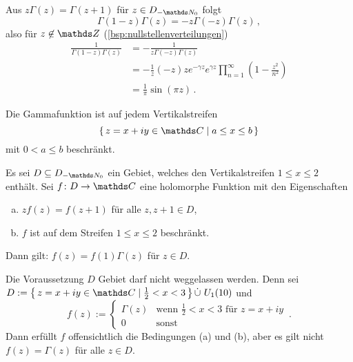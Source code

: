 \begin{bewe-list}
\item Aus $z\Gamma(z) = \Gamma(z+1)$ für $z\in D_{-\NN_0}$ folgt
\[
	\Gamma(1-z)\Gamma(z)
	= -z \Gamma(-z)\Gamma(z)
	\,,
\]
also für $z\not\in \ZZ$ (\autoref{bsp:nullstellenverteilungen})
\begin{align*}
	\frac{1}{\Gamma(1-z)\Gamma(z)}
	&= -\frac{1}{z\Gamma(-z)\Gamma(z)} \\
	&= -\frac{1}{z}(-z)ze^{-\gamma z}e^{\gamma z}\prod_{n=1}^\infty \left(1-\frac{z^2}{n^2}\right) \\
	&= \frac{1}{\pi} \sin(\pi z)
	\,.
\end{align*}
\end{bewe-list}

\begin{satz-list}\label{satz:wielandt}
\item Die Gammafunktion ist auf jedem Vertikalstreifen
\[
	\Set{z=x+iy \in\CC \mid a \leq x \leq b}
\]
mit $0 < a \leq b$ beschränkt.

\item Es sei $D\subseteq D_{-\NN_0}$ ein Gebiet, welches den Vertikalstreifen $1 \leq x \leq 2$ enthält.
Sei $f\colon D\ra \CC$ eine holomorphe Funktion mit den Eigenschaften
\begin{enumerate}[(a)]
\item $zf(z) = f(z+1)$ für alle $z, z+1\in D$,
\item $f$ ist auf dem Streifen $1\leq x \leq 2$ beschränkt.
\end{enumerate}
Dann gilt:
$f(z) = f(1) \Gamma(z)$ für $z\in D$.
\end{satz-list}

\begin{beme}
Die Voraussetzung $D$ Gebiet darf nicht weggelassen werden.
Denn sei $D := \Set{z = x+iy\in\CC \mid \frac{1}{2} < x < 3} \dot\cup\ U_1(10)$ und
\[
	f(z) :=
	\begin{cases}
		\Gamma(z) &\text{wenn } \frac{1}{2} < x < 3 \text{ für } z=x+iy \\
		0 &\text{sonst}
	\end{cases}
	\,.
\]
Dann erfüllt $f$ offensichtlich die Bedingungen (a) und (b), aber es gilt nicht $f(z) = \Gamma(z)$ für alle $z\in D$.
\end{beme}

